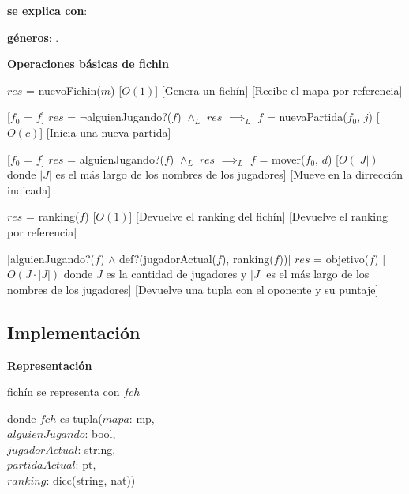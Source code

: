 \documentclass[10pt, a4paper]{article}
\begin{document}
    \begin{Interfaz}

        \textbf{se explica con}: 

        \textbf{géneros}: .

        \textbf{Operaciones básicas de fichin}

        {$res$ = nuevoFichin($m$)}%
        [$O(1)$]
        [Genera un fichín]
        [Recibe el mapa por referencia]

        [$f_0$ = $f$]
        {$res$ = $\neg$alguienJugando?($f$) $\wedge_L$ $res$ $\implies_L$ $f$ = nuevaPartida($f_0$, $j$) }%
        [$O(c)$]
        [Inicia una nueva partida]

        [$f_0$ = $f$]
        {$res$ = alguienJugando?($f$) $\wedge_L$ $res$ $\implies_L$ $f$ = mover($f_0$, $d$) }%
        [$O(|J|)$ donde $|J|$ es el más largo de los nombres de los jugadores]
        [Mueve en la dirrección indicada]

        {$res$ = ranking($f$)}%
        [$O(1)$]
        [Devuelve el ranking del fichín]
        [Devuelve el ranking por referencia]

        [alguienJugando?($f$) $\wedge$ def?(jugadorActual($f$), ranking($f$))]
        {$res$ = objetivo($f$) }%
        [$O(J \cdot |J|)$ donde $J$ es la cantidad de jugadores y $|J|$ es el más largo de los nombres de los jugadores]
        [Devuelve una tupla con el oponente y su puntaje]

    \end{Interfaz}

    \newpage

    \subsection*{Implementación}

    \textbf{Representación}

    fichín se representa con $fch$

    donde $fch$ es tupla($mapa$: mp, \\
        \text{}\qquad\quad$alguienJugando$: bool, \\
        \text{}\qquad\quad$jugadorActual$: string, \\
        \text{}\qquad\quad$partidaActual$: pt, \\
        \text{}\qquad\quad$ranking$: dicc(string, nat))
\end{document}
